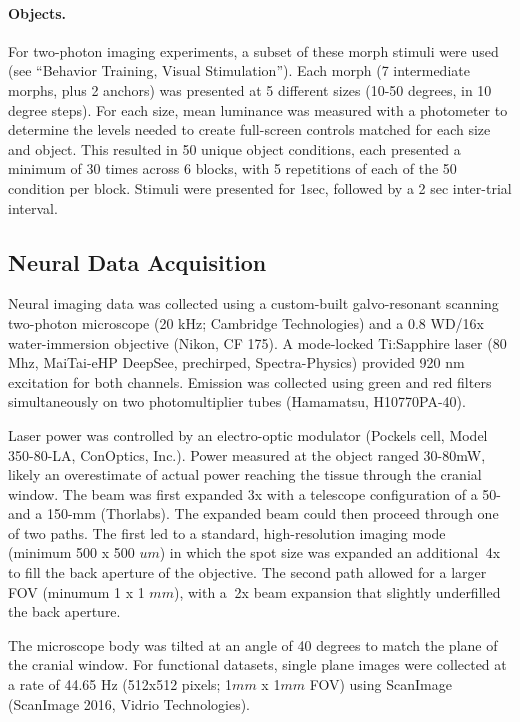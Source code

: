\paragraph{Objects.}
For two-photon imaging experiments, a subset of these morph stimuli were used (see ``Behavior Training, Visual Stimulation''). Each morph (7 intermediate morphs, plus 2 anchors) was presented at 5 different sizes (10-50 degrees, in 10 degree steps). For each size, mean luminance was measured with a photometer to determine the levels needed to create full-screen controls matched for each size and object. This resulted in 50 unique object conditions, each presented a minimum of 30 times across 6 blocks, with 5 repetitions of each of the 50 condition per block. Stimuli were presented for 1sec, followed by a 2 sec inter-trial interval. 


\subsection{Neural Data Acquisition}
Neural imaging data was collected using a custom-built galvo-resonant scanning two-photon microscope (20 kHz; Cambridge Technologies) and a 0.8 WD/16x water-immersion objective (Nikon, CF 175). A mode-locked Ti:Sapphire laser (80 Mhz, MaiTai-eHP DeepSee, prechirped, Spectra-Physics) 
provided 920 nm excitation for both channels. Emission was collected using green and red filters simultaneously on two photomultiplier tubes (Hamamatsu, H10770PA-40).

Laser power was controlled by an electro-optic modulator (Pockels cell, Model 350-80-LA, ConOptics, Inc.). Power measured at the object ranged 30-80mW, likely an overestimate of actual power reaching the tissue through the cranial window. The beam was first expanded 3x with a telescope configuration of a 50- and a 150-mm (Thorlabs). The expanded beam could then proceed through one of two paths. The first led to a standard, high-resolution imaging mode (minimum 500 x 500 $um$) in which the spot size was expanded an additional $~$4x to fill the back aperture of the objective. The second path allowed for a larger FOV (minumum 1 x 1 $mm$), with a $~$2x beam expansion that slightly underfilled the back aperture. 

 
The microscope body was tilted at an angle of 40 degrees to match the plane of the cranial window. For functional datasets, single plane images were collected at a rate of 44.65 Hz (512x512 pixels; 1$mm$ x 1$mm$ FOV) using ScanImage\cite{Pologruto2003} (ScanImage 2016, Vidrio Technologies). 

